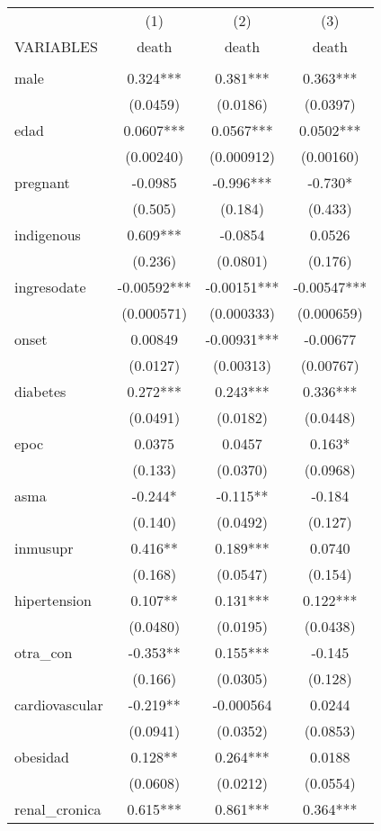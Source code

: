 \documentclass[]{article}
\begin{document}
\begin{tabular}{lccc} \hline
 & (1) & (2) & (3) \\
VARIABLES & death & death & death \\ \hline
 &  &  &  \\
male & 0.324*** & 0.381*** & 0.363*** \\
 & (0.0459) & (0.0186) & (0.0397) \\
edad & 0.0607*** & 0.0567*** & 0.0502*** \\
 & (0.00240) & (0.000912) & (0.00160) \\
pregnant & -0.0985 & -0.996*** & -0.730* \\
 & (0.505) & (0.184) & (0.433) \\
indigenous & 0.609*** & -0.0854 & 0.0526 \\
 & (0.236) & (0.0801) & (0.176) \\
ingresodate & -0.00592*** & -0.00151*** & -0.00547*** \\
 & (0.000571) & (0.000333) & (0.000659) \\
onset & 0.00849 & -0.00931*** & -0.00677 \\
 & (0.0127) & (0.00313) & (0.00767) \\
diabetes & 0.272*** & 0.243*** & 0.336*** \\
 & (0.0491) & (0.0182) & (0.0448) \\
epoc & 0.0375 & 0.0457 & 0.163* \\
 & (0.133) & (0.0370) & (0.0968) \\
asma & -0.244* & -0.115** & -0.184 \\
 & (0.140) & (0.0492) & (0.127) \\
inmusupr & 0.416** & 0.189*** & 0.0740 \\
 & (0.168) & (0.0547) & (0.154) \\
hipertension & 0.107** & 0.131*** & 0.122*** \\
 & (0.0480) & (0.0195) & (0.0438) \\
otra\_con & -0.353** & 0.155*** & -0.145 \\
 & (0.166) & (0.0305) & (0.128) \\
cardiovascular & -0.219** & -0.000564 & 0.0244 \\
 & (0.0941) & (0.0352) & (0.0853) \\
obesidad & 0.128** & 0.264*** & 0.0188 \\
 & (0.0608) & (0.0212) & (0.0554) \\
renal\_cronica & 0.615*** & 0.861*** & 0.364*** \\

\end{tabular}
\end{document}
